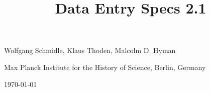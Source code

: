 \documentclass[fontsize=11pt, paper=a4, 
twoside, %
DIV15,
headings=normal,
parskip=half-, 
numbers=noenddot]{scrartcl}
\begin{document}
\title{Data Entry Specs 2.1}
\date{}
\author{}
\maketitle
\vspace{-20mm}

\begin{center}
\large Wolfgang Schmidle, Klaus Thoden, Malcolm D. Hyman

\normalsize Max Planck Institute for the History of Science, Berlin, Germany

\today
\end{center}

\tableofcontents
\newpage



\end{document}
